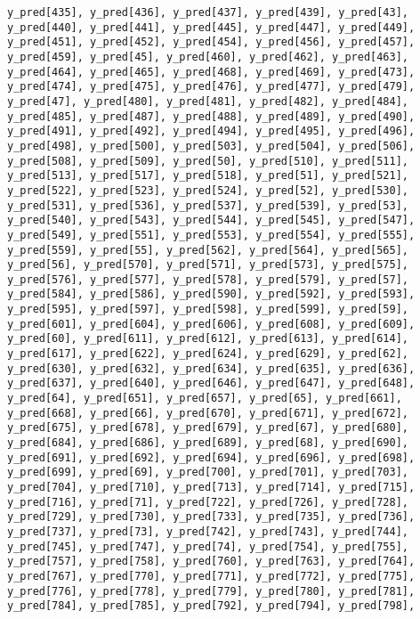 \documentclass[
  letterpaper,
  DIV=11,
  numbers=noendperiod]{scrartcl}
\begin{document}
\begin{verbatim}
y_pred[435], y_pred[436], y_pred[437], y_pred[439], y_pred[43],
y_pred[440], y_pred[441], y_pred[445], y_pred[447], y_pred[449],
y_pred[451], y_pred[452], y_pred[454], y_pred[456], y_pred[457],
y_pred[459], y_pred[45], y_pred[460], y_pred[462], y_pred[463],
y_pred[464], y_pred[465], y_pred[468], y_pred[469], y_pred[473],
y_pred[474], y_pred[475], y_pred[476], y_pred[477], y_pred[479],
y_pred[47], y_pred[480], y_pred[481], y_pred[482], y_pred[484],
y_pred[485], y_pred[487], y_pred[488], y_pred[489], y_pred[490],
y_pred[491], y_pred[492], y_pred[494], y_pred[495], y_pred[496],
y_pred[498], y_pred[500], y_pred[503], y_pred[504], y_pred[506],
y_pred[508], y_pred[509], y_pred[50], y_pred[510], y_pred[511],
y_pred[513], y_pred[517], y_pred[518], y_pred[51], y_pred[521],
y_pred[522], y_pred[523], y_pred[524], y_pred[52], y_pred[530],
y_pred[531], y_pred[536], y_pred[537], y_pred[539], y_pred[53],
y_pred[540], y_pred[543], y_pred[544], y_pred[545], y_pred[547],
y_pred[549], y_pred[551], y_pred[553], y_pred[554], y_pred[555],
y_pred[559], y_pred[55], y_pred[562], y_pred[564], y_pred[565],
y_pred[56], y_pred[570], y_pred[571], y_pred[573], y_pred[575],
y_pred[576], y_pred[577], y_pred[578], y_pred[579], y_pred[57],
y_pred[584], y_pred[586], y_pred[590], y_pred[592], y_pred[593],
y_pred[595], y_pred[597], y_pred[598], y_pred[599], y_pred[59],
y_pred[601], y_pred[604], y_pred[606], y_pred[608], y_pred[609],
y_pred[60], y_pred[611], y_pred[612], y_pred[613], y_pred[614],
y_pred[617], y_pred[622], y_pred[624], y_pred[629], y_pred[62],
y_pred[630], y_pred[632], y_pred[634], y_pred[635], y_pred[636],
y_pred[637], y_pred[640], y_pred[646], y_pred[647], y_pred[648],
y_pred[64], y_pred[651], y_pred[657], y_pred[65], y_pred[661],
y_pred[668], y_pred[66], y_pred[670], y_pred[671], y_pred[672],
y_pred[675], y_pred[678], y_pred[679], y_pred[67], y_pred[680],
y_pred[684], y_pred[686], y_pred[689], y_pred[68], y_pred[690],
y_pred[691], y_pred[692], y_pred[694], y_pred[696], y_pred[698],
y_pred[699], y_pred[69], y_pred[700], y_pred[701], y_pred[703],
y_pred[704], y_pred[710], y_pred[713], y_pred[714], y_pred[715],
y_pred[716], y_pred[71], y_pred[722], y_pred[726], y_pred[728],
y_pred[729], y_pred[730], y_pred[733], y_pred[735], y_pred[736],
y_pred[737], y_pred[73], y_pred[742], y_pred[743], y_pred[744],
y_pred[745], y_pred[747], y_pred[74], y_pred[754], y_pred[755],
y_pred[757], y_pred[758], y_pred[760], y_pred[763], y_pred[764],
y_pred[767], y_pred[770], y_pred[771], y_pred[772], y_pred[775],
y_pred[776], y_pred[778], y_pred[779], y_pred[780], y_pred[781],
y_pred[784], y_pred[785], y_pred[792], y_pred[794], y_pred[798],

\end{verbatim}
\end{document}
